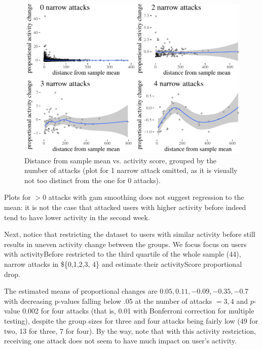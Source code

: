 \documentclass[
  10pt,
  dvipsnames]{scrartcl}
\begin{document}
\begin{figure}[H]

\begin{center}\includegraphics[width=1\linewidth]{quittingShortAbridgedRevisions3_files/figure-latex/unnamed-chunk-61-1} \end{center}
\caption{Distance from sample mean vs. activity score, grouped by the number of attacks (plot for 1 narrow attack omitted, as it is visually not too distinct from the one for 0 attacks).}
\label{fig:regression2}
\end{figure}

Plots for \(>0\) attacks with gam smoothing does not suggest regression
to the mean: it is not the case that attacked users with higher activity
before indeed tend to have lower activity in the second week.

Next, notice that restricting the dataset to users with similar activity
before still results in uneven activity change between the groups. We
focus focus on users with \textsf{activityBefore} restricted to the
third quartile of the whole sample (44), narrow attacks in \$\{0,1,2,3,
4\} and estimate their \textsf{activityScore} proportional drop.

\normalsize

The estimated means of proportional changes are
\(0.05, 0.11, -0.09,-0.35, -0.7\) with decreasing p-values falling below
.05 at the number of attacks \(=3, 4\) and \(p\)-value 0.002 for four
attacks (that is, 0.01 with Bonferroni correction for multiple testing),
despite the group sizes for three and four attacks being fairly low (49
for two, 13 for three, 7 for four). By the way, note that with this
activity restriction, receiving one attack does not seem to have much
impact on user's activity.
\end{document}
